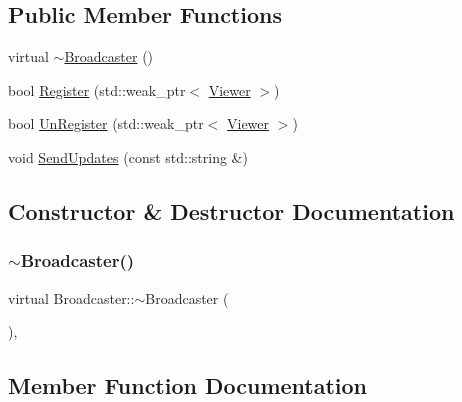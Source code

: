 \subsection*{Public Member Functions}
\begin{DoxyCompactItemize}
\item 
virtual \mbox{\hyperlink{class_broadcaster_a04357704901fdbea84db17f6c6a2f701}{$\sim$\+Broadcaster}} ()
\item 
bool \mbox{\hyperlink{class_broadcaster_abff325f58fd35165c968cbf31276e0ab}{Register}} (std\+::weak\+\_\+ptr$<$ \mbox{\hyperlink{class_viewer}{Viewer}} $>$)
\item 
bool \mbox{\hyperlink{class_broadcaster_ab3ab62a97391f6dfebce031e7b6f39ac}{Un\+Register}} (std\+::weak\+\_\+ptr$<$ \mbox{\hyperlink{class_viewer}{Viewer}} $>$)
\item 
void \mbox{\hyperlink{class_broadcaster_a3be261b528ffd56850ae45f1edc92596}{Send\+Updates}} (const std\+::string \&)
\end{DoxyCompactItemize}


\subsection{Constructor \& Destructor Documentation}
\mbox{\label{class_broadcaster_a04357704901fdbea84db17f6c6a2f701}} 
\subsubsection{\texorpdfstring{$\sim$Broadcaster()}{~Broadcaster()}}
{\footnotesize\ttfamily virtual Broadcaster\+::$\sim$\+Broadcaster (\begin{DoxyParamCaption}{ }\end{DoxyParamCaption})\hspace{0.3cm}{\ttfamily [inline]}, {\ttfamily [virtual]}}



\subsection{Member Function Documentation}
\mbox{\label{class_broadcaster_abff325f58fd35165c968cbf31276e0ab}} 
